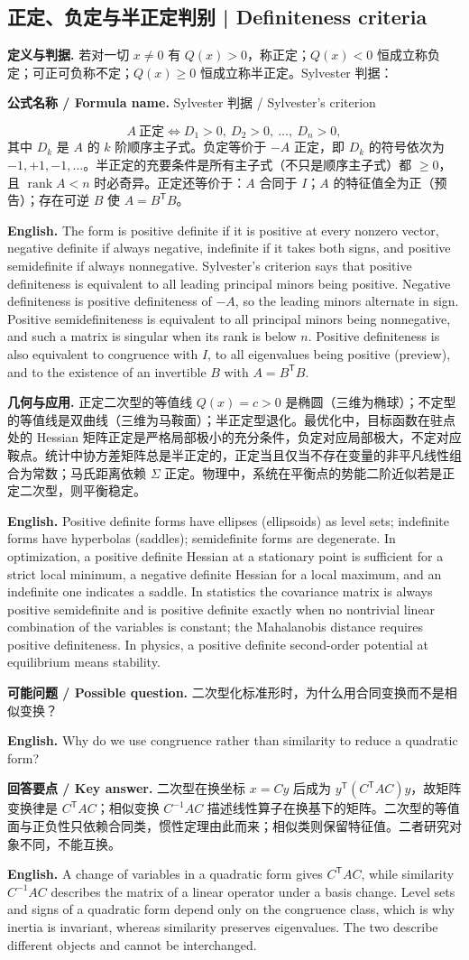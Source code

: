 \documentclass[UTF8,11pt,a4paper]{ctexart}
\newcommand{\EN}[1]{\par\noindent\textbf{English.} #1\par}
\newcommand{\FORMULA}[2]{\par\noindent\textbf{公式名称 / Formula name.} #1 / #2\par}
\newcommand{\ASK}[4]{\par\noindent\textbf{可能问题 / Possible question.} #1\par\EN{#2}\noindent\textbf{回答要点 / Key answer.} #3\par\EN{#4}\medskip}
\begin{document}
\subsection{正定、负定与半正定判别 | Definiteness criteria}
\noindent\textbf{定义与判据.} 若对一切 $x\ne0$ 有 $Q(x)>0$，称正定；$Q(x)<0$ 恒成立称负定；可正可负称不定；$Q(x)\ge0$ 恒成立称半正定。Sylvester 判据：
\FORMULA{Sylvester 判据}{Sylvester's criterion}
\[
A\ \text{正定}\iff D_1>0,\ D_2>0,\ \dots,\ D_n>0,
\]
其中 $D_k$ 是 $A$ 的 $k$ 阶顺序主子式。负定等价于 $-A$ 正定，即 $D_k$ 的符号依次为 $-1,+1,-1,\dots$。半正定的充要条件是所有主子式（不只是顺序主子式）都 $\ge0$，且 $\operatorname{rank}A<n$ 时必奇异。正定还等价于：$A$ 合同于 $I$；$A$ 的特征值全为正（预告）；存在可逆 $B$ 使 $A=B^{\mathsf T}B$。
\EN{The form is positive definite if it is positive at every nonzero vector, negative definite if always negative, indefinite if it takes both signs, and positive semidefinite if always nonnegative. Sylvester's criterion says that positive definiteness is equivalent to all leading principal minors being positive. Negative definiteness is positive definiteness of $-A$, so the leading minors alternate in sign. Positive semidefiniteness is equivalent to all principal minors being nonnegative, and such a matrix is singular when its rank is below $n$. Positive definiteness is also equivalent to congruence with $I$, to all eigenvalues being positive (preview), and to the existence of an invertible $B$ with $A=B^{\mathsf T}B$.}
\noindent\textbf{几何与应用.} 正定二次型的等值线 $Q(x)=c>0$ 是椭圆（三维为椭球）；不定型的等值线是双曲线（三维为马鞍面）；半正定型退化。最优化中，目标函数在驻点处的 Hessian 矩阵正定是严格局部极小的充分条件，负定对应局部极大，不定对应鞍点。统计中协方差矩阵总是半正定的，正定当且仅当不存在变量的非平凡线性组合为常数；马氏距离依赖 $\Sigma$ 正定。物理中，系统在平衡点的势能二阶近似若是正定二次型，则平衡稳定。
\EN{Positive definite forms have ellipses (ellipsoids) as level sets; indefinite forms have hyperbolas (saddles); semidefinite forms are degenerate. In optimization, a positive definite Hessian at a stationary point is sufficient for a strict local minimum, a negative definite Hessian for a local maximum, and an indefinite one indicates a saddle. In statistics the covariance matrix is always positive semidefinite and is positive definite exactly when no nontrivial linear combination of the variables is constant; the Mahalanobis distance requires positive definiteness. In physics, a positive definite second-order potential at equilibrium means stability.}
\ASK{二次型化标准形时，为什么用合同变换而不是相似变换？}{Why do we use congruence rather than similarity to reduce a quadratic form?}{二次型在换坐标 $x=Cy$ 后成为 $y^{\mathsf T}(C^{\mathsf T}AC)y$，故矩阵变换律是 $C^{\mathsf T}AC$；相似变换 $C^{-1}AC$ 描述线性算子在换基下的矩阵。二次型的等值面与正负性只依赖合同类，惯性定理由此而来；相似类则保留特征值。二者研究对象不同，不能互换。}{A change of variables in a quadratic form gives $C^{\mathsf T}AC$, while similarity $C^{-1}AC$ describes the matrix of a linear operator under a basis change. Level sets and signs of a quadratic form depend only on the congruence class, which is why inertia is invariant, whereas similarity preserves eigenvalues. The two describe different objects and cannot be interchanged.}
\end{document}
